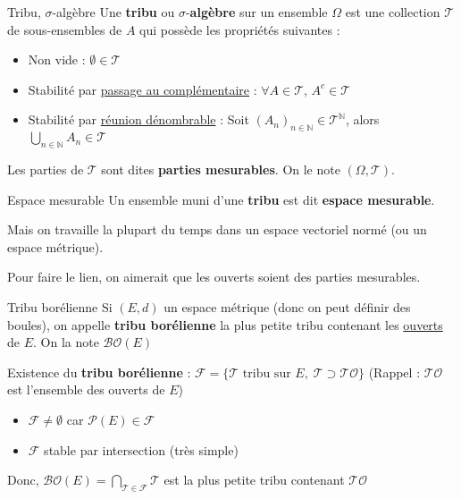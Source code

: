 \begin{Definition}[colbacktitle=red!75!black]{Tribu, $\sigma$-algèbre}{}
Une \textbf{tribu} ou $\sigma$-\textbf{algèbre} sur un ensemble \( \Omega \) est une collection \( \mathcal{T} \) de sous-ensembles de \( A \) qui possède les propriétés suivantes : \begin{itemize}

   \item Non vide : $\emptyset \in \mathcal{T}$

    \item Stabilité par \underline{passage au complémentaire} : $\forall A \in \mathcal{T}$, $A ^{c} \in \mathcal{T}$
    \item Stabilité par \underline{réunion dénombrable} : Soit $(A_n) _{n \in \mathbb{N}} \in \mathcal{T} ^{\mathbb{N}}$, alors $\bigcup _{n \in \mathbb{N}} A _n \in \mathcal{T}$

\end{itemize}

Les parties de $\mathcal{T}$ sont dites \textbf{parties mesurables}. On le note $(\Omega, \mathcal{T})$.
\end{Definition}

\begin{Definition}[colbacktitle=red!75!black]{Espace mesurable}{}
Un ensemble muni d'une \textbf{tribu} est dit \textbf{espace mesurable}. 
\end{Definition}



Mais on travaille la plupart du temps dans un espace vectoriel normé (ou un espace métrique). 

Pour faire le lien, on aimerait que les ouverts soient des parties mesurables. 

\begin{Definition}[colbacktitle=red!75!black]{Tribu borélienne}{}
  Si $(E,d)$ un espace métrique (donc on peut définir des boules), on appelle \textbf{tribu borélienne} {la plus petite tribu} contenant les \underline{ouverts} de $E$. On la note $\boxed{\mathcal{BO}(E)}$
\end{Definition}

\begin{myproof}{}{} Existence du \textbf{tribu borélienne} : 
  $\mathcal{F}= \{ \mathcal{T} \text{ tribu sur } E, \; \mathcal{T} \supset \mathcal{TO}\}$ (Rappel : $\mathcal{TO}$ est l'ensemble des ouverts de $E$)
  \begin{itemize}

      \item $\mathcal{F} \ne \emptyset$ car $\mathscr{P}(E) \in \mathcal{F}$ 
      \item $\mathcal{F}$ stable par intersection (très simple)

  \end{itemize}
  Donc, $\mathcal{BO}(E) = \bigcap _{\mathcal{T} \in \mathcal{F}} \mathcal{T}$ est la plus petite tribu contenant $\mathcal{TO}$
\end{myproof}

